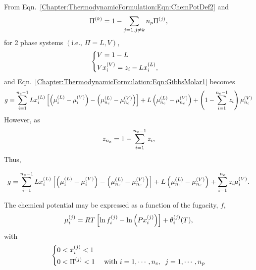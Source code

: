 From Eqn.~\ref{Chapter:ThermodynamicFormulation:Eqn:ChemPotDef2} and
\begin{displaymath}
   \mfr[\Pi]{}{k} = 1 - \summation_{j=1,j\ne k}{n_{p}} \mfr[\Pi]{}{j},
\end{displaymath}
for 2 phase systems $\left(\text{i.e., } \Pi = L, V\right)$, 
\begin{displaymath}
  \left \{
  \begin{aligned}
    & V = 1 - L && \\
    & V\mfr[x]{i}{V} = z_{i} - L\mfr[x]{i}{L},
  \end{aligned} \right.
\end{displaymath} 
and Eqn.~\ref{Chapter:ThermodynamicFormulation:Eqn:GibbsMolar1} becomes
\begin{equation}
  g = \summation_{i=1}^{n_{c}-1} L\mfr[x]{i}{L}\left[\left(\mfr[\mu]{i}{L}-\mfr[\mu]{i}{V}\right)-\left(\mfr[\mu]{n_{c}}{L}-\mfr[\mu]{n_{c}}{V}\right)\right] + L\left(\mfr[\mu]{n_{c}}{L}-\mfr[\mu]{n_{c}}{V}\right) +  \left(1 - \summation_{i=1}^{n_{c}-1}z_{i}\right)\mfr[\mu]{n_{c}}{V}
\end{equation}
However, as
\begin{displaymath}
   z_{n_{c}} = 1 - \summation_{i=1}^{n_{c}-1}z_{i},
\end{displaymath}
Thus,
\begin{shaded}\noindent
   \begin{equation}
  g = \summation_{i=1}^{n_{c}-1} L\mfr[x]{i}{L}\left[\left(\mfr[\mu]{i}{L}-\mfr[\mu]{i}{V}\right)-\left(\mfr[\mu]{n_{c}}{L}-\mfr[\mu]{n_{c}}{V}\right)\right] + L\left(\mfr[\mu]{n_{c}}{L}-\mfr[\mu]{n_{c}}{V}\right) + \summation_{i=1}^{n_{c}}z_{i}\mfr[\mu]{i}{V}.\label{Chapter:ThermodynamicFormulation:Eqn:GibbsMolarFinal}
   \end{equation}
\end{shaded}

The chemical potential may be expressed as a function of the fugacity, $f$,
\begin{equation}
   \mfr[\mu]{i}{j} = RT\left[\ln{\mfr[f]{i}{j}}-\ln{\left(P\mfr[x]{i}{j}\right)}\right] + \mfr[\theta]{i}{j}(T),
\end{equation}
with
\begin{displaymath}
  \left \{
  \begin{aligned}
    & 0 < \mfr[x]{i}{j} < 1 &&  \\
    & 0 < \mfr[\Pi]{}{j} < 1 && \text{ with }  i = 1, \cdots, n_{c},\;\; j = 1, \cdots, n_{p}
  \end{aligned} \right.
\end{displaymath} 

